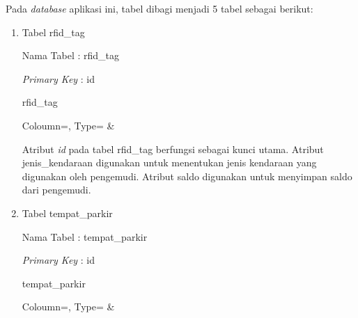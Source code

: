 Pada \textit{database} aplikasi ini, tabel dibagi menjadi 5 tabel sebagai berikut:

\begin{enumerate}[topsep=0pt,itemsep=0pt,partopsep=0pt, parsep=0pt]
    \item Tabel rfid\_tag

    Nama Tabel : rfid\_tag

    \textit{Primary Key} : id

    \begin{atable}
        \caption{rfid\_tag}
        \label{table:db_rfid_tag}
            {
                Coloumn=\Coloumn, 
                Type=\Type}
            {
                \Coloumn & 
                \Type}
    \end{atable}

    Atribut \textit{id} pada tabel rfid\_tag berfungsi sebagai kunci utama. Atribut jenis\_kendaraan digunakan untuk menentukan jenis kendaraan yang digunakan oleh pengemudi. Atribut saldo digunakan untuk menyimpan saldo dari pengemudi.

    \item Tabel tempat\_parkir

    Nama Tabel : tempat\_parkir

    \textit{Primary Key} : id

    \begin{table} [H]
        \centering
        \caption{tempat\_parkir}
        \label{table:db_tempat_parkir}
            {
                Coloumn=\Coloumn, 
                Type=\Type}
            {
                \Coloumn & 
                \Type}
    \end{table}


\end{enumerate}
